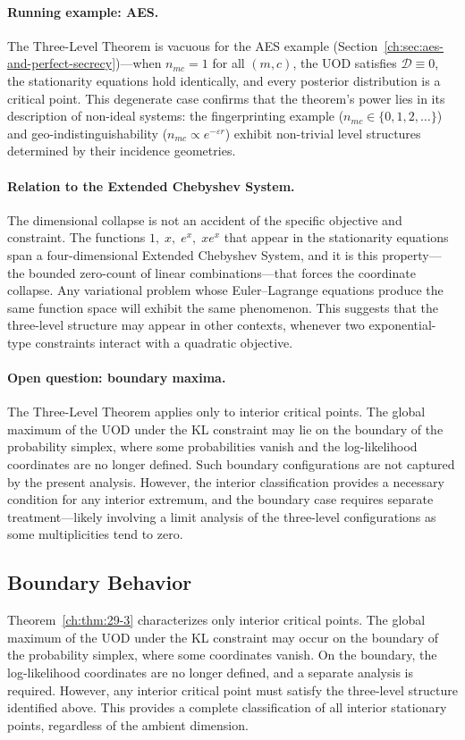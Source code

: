 \paragraph{Running example: AES.}
The Three-Level Theorem is vacuous for the AES example (Section~\ref{ch:sec:aes-and-perfect-secrecy})---when $n_{mc}=1$ for all $(m,c)$, the UOD satisfies $\mathcal D\equiv0$, the stationarity equations hold identically, and every posterior distribution is a critical point.  This degenerate case confirms that the theorem's power lies in its description of non-ideal systems: the fingerprinting example ($n_{mc}\in\{0,1,2,\dots\}$) and geo-indistinguishability ($n_{mc}\propto e^{-\varepsilon r}$) exhibit non-trivial level structures determined by their incidence geometries.

\paragraph{Relation to the Extended Chebyshev System.}
The dimensional collapse is not an accident of the specific objective
and constraint.  The functions \(1,\;x,\;e^x,\;xe^x\) that appear in the
stationarity equations span a four-dimensional Extended Chebyshev
System, and it is this property---the bounded zero-count of linear
combinations---that forces the coordinate collapse.  Any variational
problem whose Euler--Lagrange equations produce the same function space
will exhibit the same phenomenon.  This suggests that the three-level
structure may appear in other contexts, whenever two exponential-type
constraints interact with a quadratic objective.

\paragraph{Open question: boundary maxima.}
The Three-Level Theorem applies only to interior critical points.
The global maximum of the UOD under the KL constraint may lie on the
boundary of the probability simplex, where some probabilities vanish
and the log-likelihood coordinates are no longer defined.  Such
boundary configurations are not captured by the present analysis.
However, the interior classification provides a necessary condition for
any interior extremum, and the boundary case requires separate
treatment---likely involving a limit analysis of the three-level
configurations as some multiplicities tend to zero.
\subsection{Boundary Behavior}\label{ch:sec:boundary-behavior}
Theorem~\ref{ch:thm:29-3} characterizes only interior critical points. The global maximum of the UOD under the KL constraint may occur on the boundary of the probability simplex, where some coordinates vanish.
On the boundary, the log-likelihood coordinates are no longer defined, and a separate analysis is required.
However, any interior critical point must satisfy the three-level structure identified above. This provides a complete classification of all interior stationary points, regardless of the ambient dimension.

